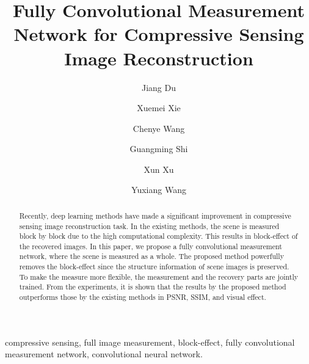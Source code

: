 \documentclass[review]{elsarticle}
\begin{document}
\begin{frontmatter}

\title{Fully Convolutional Measurement Network for Compressive Sensing Image Reconstruction}

\author{Jiang Du}

\author{Xuemei Xie}

\author{Chenye Wang}

\author{Guangming Shi}

\author{Xun Xu}

\author{Yuxiang Wang}


\address{School of Artificial
Intelligence, Xidian University, Xi'an, Shaanxi 710071, PR China}

\begin{abstract}
Recently, deep learning methods have made a significant improvement in compressive sensing image reconstruction task. In the existing methods, the scene is measured block by block due to the high computational complexity. This results in block-effect of the recovered images. In this paper, we propose a fully convolutional measurement network, where the scene is measured as a whole. The proposed method powerfully removes the block-effect since the structure information of scene images is preserved. To make the measure more flexible, the measurement and the recovery parts are jointly trained. From the experiments, it is shown that the results by the proposed method outperforms those by the existing methods in PSNR, SSIM, and visual effect.
\end{abstract}

\begin{keyword}
compressive sensing, full image measurement, block-effect, fully convolutional measurement network, convolutional neural network.
\end{keyword}

\end{frontmatter}
\end{document}
